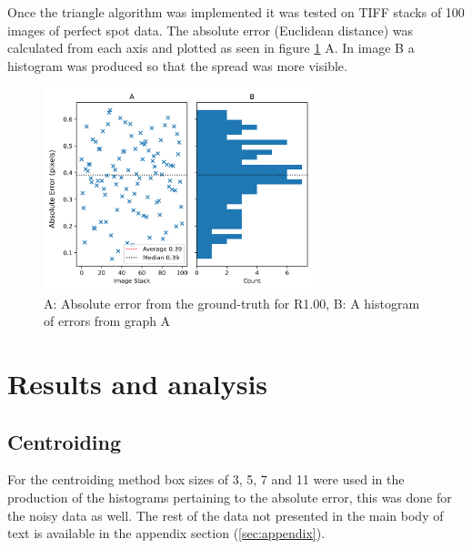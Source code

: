 \documentclass[aps,pra,a4paper,nofootinbib,onecolumn,tightenlines,longbibliography,12pt,amsfonts,amssymb,amsmath,floatfix]{revtex4-2} %
\begin{document}
    Once the triangle algorithm was implemented it was tested on TIFF stacks of 100 images 
    of perfect spot data. The absolute error (Euclidean distance) was calculated from each 
    axis and plotted as seen in figure \ref{fig:single_histo} A. In image B a histogram 
    was produced so that the spread was more visible.

    \begin{figure}[H]
    \begin{center}
      \includegraphics[width=0.7\textwidth]{project_pics/single_histo.png}
    \end{center}
    \caption{A: Absolute error from the ground-truth for R1.00, B: A histogram of errors from graph A}
    \label{fig:single_histo}
  \end{figure}
    
    

\section{Results and analysis} %
\label{sec:Results}

  \subsection{Centroiding} %
  \label{sub:Centroiding_results}

  For the centroiding method box sizes of 3, 5, 7 and 11 were used in the production 
  of the histograms pertaining to the absolute error, this was done for the noisy data as 
  well. The rest of the data not presented in the main body of text is available in the appendix 
  section (\ref{sec:appendix}).
\end{document}
